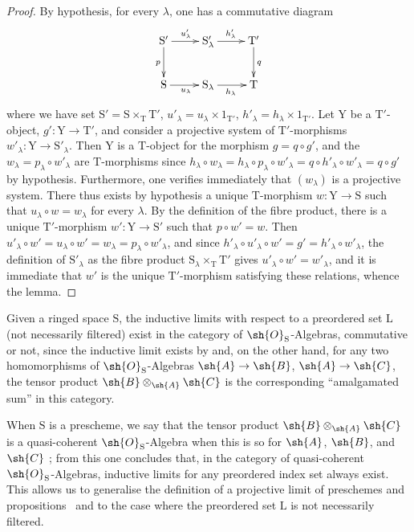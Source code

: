 \begin{proof}
By hypothesis, for every $\lambda$, one has a commutative diagram
\[
\xymatrix{
  \mathrm{S}' \ar[r]^{u'_\lambda} \ar[d]_p & \mathrm{S}'_\lambda \ar[r]^{h'_\lambda} & \mathrm{T}' \ar[d]^q \\
  \mathrm{S} \ar[r]_{u_\lambda} & \mathrm{S}_\lambda \ar[r]_{h_\lambda} & \mathrm{T}
}
\]
where we have set $\mathrm{S}'=\mathrm{S}\times_\mathrm{T}\mathrm{T}'$, $u'_\lambda=u_\lambda\times 1_{\mathrm{T}'}$, $h'_\lambda=h_\lambda\times 1_{\mathrm{T}'}$.
Let $\mathrm{Y}$ be a $\mathrm{T}'$-object, $g':\mathrm{Y}\to\mathrm{T}'$, and consider a projective system of $\mathrm{T}'$-morphisms $w'_\lambda:\mathrm{Y}\to\mathrm{S}'_\lambda$.
Then $\mathrm{Y}$ is a $\mathrm{T}$-object for the morphism $g=q\circ g'$, and the $w_\lambda=p_\lambda\circ w'_\lambda$ are $\mathrm{T}$-morphisms since $h_\lambda\circ w_\lambda=h_\lambda\circ p_\lambda\circ w'_\lambda=q\circ h'_\lambda\circ w'_\lambda=q\circ g'$ by hypothesis.
Furthermore, one verifies immediately that $(w_\lambda)$ is a projective system.
There thus exists by hypothesis a unique $\mathrm{T}$-morphism $w:\mathrm{Y}\to\mathrm{S}$ such that $u_\lambda\circ w=w_\lambda$ for every $\lambda$.
By the definition of the fibre product, there is a unique $\mathrm{T}'$-morphism $w':\mathrm{Y}\to\mathrm{S}'$ such that $p\circ w'=w$.
Then $u'_\lambda\circ w'=u_\lambda\circ w'=w_\lambda=p_\lambda\circ w'_\lambda$, and since $h'_\lambda\circ u'_\lambda\circ w'=g'=h'_\lambda\circ w'_\lambda$, the definition of $\mathrm{S}'_\lambda$ as the fibre product $\mathrm{S}_\lambda\times_\mathrm{T}\mathrm{T}'$ gives $u'_\lambda\circ w'=w'_\lambda$, and it is immediate that $w'$ is the unique $\mathrm{T}'$-morphism satisfying these relations, whence the lemma.
\end{proof}

\begin{remark}[8.2.7]
\label{IV.8.2.7}
Given a ringed space $\mathrm{S}$, the inductive limits with respect to a preordered set $\mathrm{L}$ (not necessarily filtered) exist in the category of $\sh{O}_\mathrm{S}$-Algebras, commutative or not, since the inductive limit exists by  and, on the other hand, for any two homomorphisms of $\sh{O}_\mathrm{S}$-Algebras $\sh{A}\to\sh{B}$, $\sh{A}\to\sh{C}$, the tensor product $\sh{B}\otimes_{\sh{A}}\sh{C}$ is the corresponding ``amalgamated sum'' in this category.

When $\mathrm{S}$ is a prescheme, we say that the tensor product $\sh{B}\otimes_{\sh{A}}\sh{C}$ is a quasi-coherent $\sh{O}_\mathrm{S}$-Algebra when this is so for $\sh{A}$, $\sh{B}$, and $\sh{C}$ ; from this one concludes that, in the category of quasi-coherent $\sh{O}_\mathrm{S}$-Algebras, inductive limits for any preordered index set always exist.
This allows us to generalise the definition of a projective limit of preschemes and propositions~ and  to the case where the preordered set $\mathrm{L}$ is not necessarily filtered.
\end{remark}

